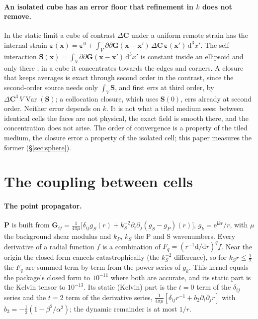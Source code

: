 \documentclass[11pt,a4paper]{article}
\newcommand{\bP}{\mathbf{P}}
\newcommand{\dd}{\mathrm{d}}
\begin{document}
\paragraph{An isolated cube has an error floor that refinement in $k$ does not remove.} In the static
limit a cube of contrast $\Delta\mathbf{C}$ under a uniform remote strain has the internal strain
$\boldsymbol{\varepsilon}(\mathbf{x})=\boldsymbol{\varepsilon}^0+\int_V\partial\partial\mathbf{G}(\mathbf{x}-\mathbf{x}')\,
\Delta\mathbf{C}\,\boldsymbol{\varepsilon}(\mathbf{x}')\,\dd^3x'$. The self-interaction
$\mathbf{S}(\mathbf{x})=\int_V\partial\partial\mathbf{G}(\mathbf{x}-\mathbf{x}')\,\dd^3x'$ is constant
inside an ellipsoid and only there \citep{Eshelby1957}; in a cube it concentrates towards the edges and
corners. A closure that keeps averages is exact through second order in the contrast, since the
second-order source needs only $\int_V\mathbf{S}$, and first errs at third order, by
$\Delta\mathbf{C}^3\,V\operatorname{Var}(\mathbf{S})$; a collocation closure, which uses
$\mathbf{S}(0)$, errs already at second order. Neither error depends on $k$. It is not what a tiled medium
sees: between identical cells the faces are not physical, the exact field is smooth there, and the
concentration does not arise. The order of convergence is a property of the tiled medium, the closure
error a property of the isolated cell; this paper measures the former
(\S\ref{sec:sphere}).

\section{The coupling between cells}\label{sec:coupling}

\paragraph{The point propagator.} $\bP$ is built from
$\mathbf{G}_{ij}=\frac{1}{4\pi\mu}\bigl[\delta_{ij}g_S(r)+k_S^{-2}\partial_i\partial_j(g_S-g_P)(r)\bigr]$,
$g_k=\mathrm{e}^{\mathrm{i}kr}/r$, with $\mu$ the background shear modulus and $k_P$, $k_S$ the P and S
wavenumbers. Every derivative of a radial function $f$ is a combination of
$F_q=(r^{-1}\dd/\dd r)^q f$. Near the origin the closed form cancels catastrophically (the
$k_S^{-2}$ difference), so for $k_Sr\le\tfrac12$ the $F_q$ are summed term by term from the power series
of $g_k$. This kernel equals the package's closed form to $10^{-11}$ where both are accurate, and its
static part is the Kelvin tensor to $10^{-13}$. Its static (Kelvin) part is the $t=0$ term of the
$\delta_{ij}$ series and the $t=2$ term of the derivative series, $\frac{1}{4\pi\mu}[\delta_{ij}r^{-1}
+b_2\partial_i\partial_jr]$ with $b_2=-\tfrac12(1-\beta^2/\alpha^2)$; the dynamic remainder is at most
$1/r$.
\end{document}
